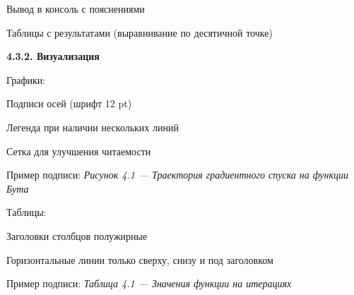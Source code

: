 \documentclass{article}%
\begin{document}
\begin{flushleft}%
Вывод в консоль с пояснениями%
%
\end{flushleft}%
\begin{flushleft}%
Таблицы с результатами (выравнивание по десятичной точке)%
%
\end{flushleft}%
\begin{flushleft}%
\textbf{4.3.2. Визуализация}%
%
\end{flushleft}%
\begin{flushleft}%
Графики:%
%
\end{flushleft}%
\begin{flushleft}%
Подписи осей (шрифт 12 pt)%
%
\end{flushleft}%
\begin{flushleft}%
Легенда при наличии нескольких линий%
%
\end{flushleft}%
\begin{flushleft}%
Сетка для улучшения читаемости%
%
\end{flushleft}%
\begin{flushleft}%
Пример подписи: %
\textit{Рисунок 4.1 — Траектория градиентного спуска на функции Бута}%
%
\end{flushleft}%
\begin{flushleft}%
Таблицы:%
%
\end{flushleft}%
\begin{flushleft}%
Заголовки столбцов полужирные%
%
\end{flushleft}%
\begin{flushleft}%
Горизонтальные линии только сверху, снизу и под заголовком%
%
\end{flushleft}%
\begin{flushleft}%
Пример подписи: %
\textit{Таблица 4.1 — Значения функции на итерациях}%
%
\end{flushleft}%
\end{document}

